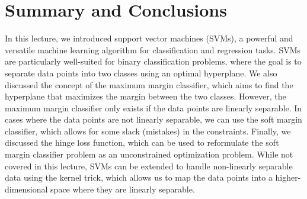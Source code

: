 \documentclass{article}[11pt]
\begin{document}
\section{Summary and Conclusions}
In this lecture, we introduced support vector machines (SVMs), a powerful and versatile machine learning algorithm for classification and regression tasks. SVMs are particularly well-suited for binary classification problems, where the goal is to separate data points into two classes using an optimal hyperplane. We also discussed the concept of the maximum margin classifier, which aims to find the hyperplane that maximizes the margin between the two classes. However, the maximum margin classifier only exists if the data points are linearly separable. 
In cases where the data points are not linearly separable, we can use the soft margin classifier, which allows for some slack (mistakes) in the constraints. Finally, we discussed the hinge loss function, which can be used to reformulate the soft margin classifier problem as an unconstrained optimization problem. While not covered in this lecture, SVMs can be extended to handle non-linearly separable data using the kernel trick, which allows us to map the data points into a higher-dimensional space where they are linearly separable. 

\raggedright

\end{document}
